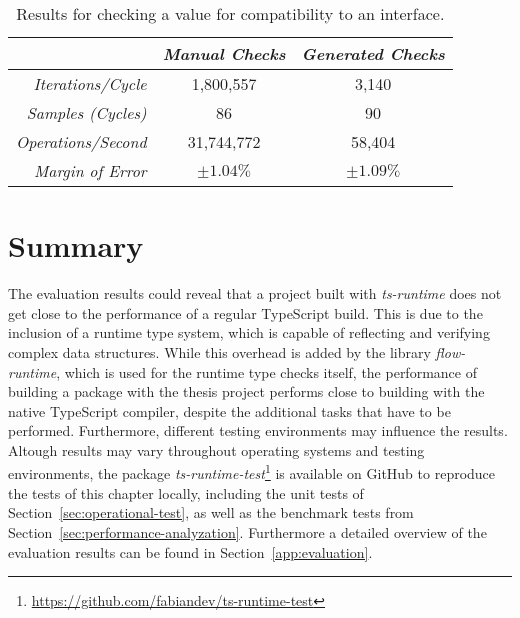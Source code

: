 \begin{table}[ht]
\begin{subtable}[ht]{1.0\textwidth}
    \label{tab:benchmarks:class}
  \end{subtable}
  \begin{subtable}[ht]{1.0\textwidth}
    \setlength{\tabcolsep}{5mm}
    \def\arraystretch{1.25}
    \centering
    \begin{tabular}{|r||c|c|}
      \hline
      & \emph{Manual Checks} & \emph{Generated Checks} \\
      \hline
      \hline
      \emph{Iterations/Cycle} & 1,800,557 & 3,140 \\
      \hline
      \emph{Samples (Cycles)} & 86 & 90 \\
      \hline
      \emph{Operations/Second} & 31,744,772 & 58,404 \\
      \hline
      \emph{Margin of Error} & $\pm 1.04\%$ & $\pm 1.09\%$ \\
      \hline
    \end{tabular}
    \caption{Results for checking a value for compatibility to an interface.}
    \label{tab:benchmarks:interface}
  \end{subtable}
\end{table}

\section{Summary}
\label{sec:evaluation-summary}

The evaluation results could reveal that a project built with \emph{ts-runtime} does not get close to the performance of a regular TypeScript build. This is due to the inclusion of a runtime type system, which is capable of reflecting and verifying complex data structures. While this overhead is added by the library \emph{flow-runtime}, which is used for the runtime type checks itself, the performance of building a package with the thesis project performs close to building with the native TypeScript compiler, despite the additional tasks that have to be performed. Furthermore, different testing environments may influence the results. Altough results may vary throughout operating systems and testing environments, the package \emph{ts-runtime-test}\footnote{\url{https://github.com/fabiandev/ts-runtime-test}} is available on GitHub to reproduce the tests of this chapter locally, including the unit tests of Section~\ref{sec:operational-test}, as well as the benchmark tests from Section~\ref{sec:performance-analyzation}. Furthermore a detailed overview of the evaluation results can be found in Section~\ref{app:evaluation}.
